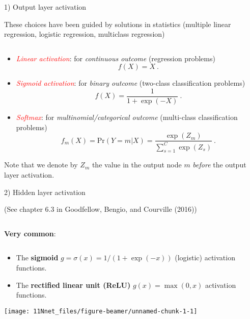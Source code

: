 \documentclass[
  10pt,
  ignorenonframetext,
]{beamer}
\providecommand{\tightlist}{%
  \setlength{\itemsep}{0pt}\setlength{\parskip}{0pt}}
\begin{document}
\begin{frame}
\begin{block}{1) Output layer activation}
\protect\hypertarget{output-layer-activation}{}
\(~\)

These choices have been guided by solutions in statistics (multiple
linear regression, logistic regression, multiclass regression)

\(~\)

\begin{itemize}
\item
  \emph{\textcolor{red}{Linear activation}}: for \emph{continuous
  outcome} (regression problems) \[f(X)=X \ .\]
\item
  \emph{\textcolor{red}{Sigmoid activation}}: for \emph{binary outcome}
  (two-class classification problems) \[f(X)=\frac{1}{1+\exp(-X)} \ .\]
\item
  \emph{\textcolor{red}{Softmax}}: for \emph{multinomial/categorical
  outcome} (multi-class classification problems) \[
  f_m(X) =  \text{Pr}(Y=m | X ) = \frac{\exp(Z_m)}{\sum_{s=1}^{C}\exp(Z_s)} \ .
  \]
\end{itemize}

\scriptsize

Note that we denote by \(Z_m\) the value in the output node \(m\)
\emph{before} the output layer activation.
\end{block}
\end{frame}

\begin{frame}
\begin{block}{2) Hidden layer activation}
\protect\hypertarget{hidden-layer-activation}{}
\tiny

(See chapter 6.3 in Goodfellow, Bengio, and Courville (2016))

\normalsize

\(~\)

\textbf{Very common}:

\(~\)

\begin{itemize}
\tightlist
\item
  The \textbf{sigmoid} \(g=\sigma(x)=1/(1+\exp(-x))\) (logistic)
  activation functions.
\item
  The \textbf{rectified linear unit (ReLU)} \(g(x)=\max(0,x)\)
  activation functions.
\end{itemize}

\vspace{2mm}

\centering

\texttt{[image: 11Nnet\_files/figure-beamer/unnamed-chunk-1-1]}
\end{block}
\end{frame}
\end{document}
